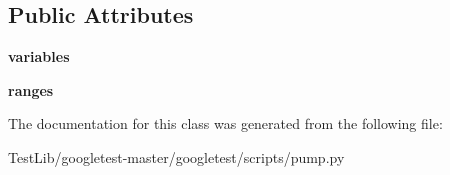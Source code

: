 \subsection*{Public Attributes}
\begin{DoxyCompactItemize}
\item 
\mbox{\label{classpump_1_1Env_aba6456f3d0d23ac92bc9508c1b966bcd}} 
{\bfseries variables}
\item 
\mbox{\label{classpump_1_1Env_a8d5fec087c1a9108de9b105922b34309}} 
{\bfseries ranges}
\end{DoxyCompactItemize}


The documentation for this class was generated from the following file\+:\begin{DoxyCompactItemize}
\item 
Test\+Lib/googletest-\/master/googletest/scripts/pump.\+py\end{DoxyCompactItemize}
